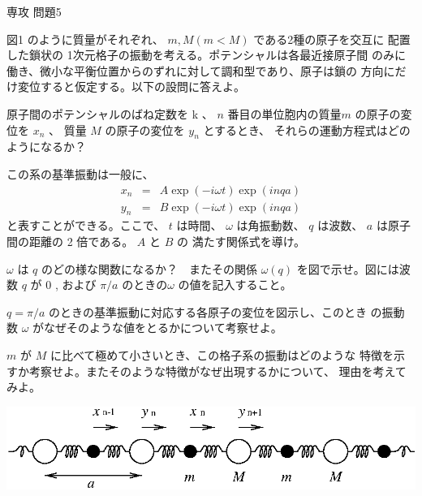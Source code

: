 \documentclass[fleqn]{jbook}
\begin{document}
\begin{question}{専攻 問題5}{}


図1 のように質量がそれぞれ、 $m, M (m < M)$ である2種の原子を交互に
配置した鎖状の 1次元格子の振動を考える。ポテンシャルは各最近接原子間
のみに働き、微小な平衡位置からのずれに対して調和型であり、原子は鎖の
方向にだけ変位すると仮定する。以下の設問に答えよ。

\begin{subquestions}
\SubQuestion
  原子間のポテンシャルのばね定数を k 、 $n$ 番目の単位胞内の質量$m$
  の原子の変位を $x_n$ 、 質量 $M$ の原子の変位を $y_n$ とするとき、
  それらの運動方程式はどのようになるか？


\SubQuestion
  この系の基準振動は一般に、
%
  \begin{eqnarray*}
    x_n &=& A \exp ( - i\omega t) \exp (i n q a) \\
    y_n &=& B \exp ( - i\omega t) \exp (i n q a)
  \end{eqnarray*}
%
  と表すことができる。ここで、 $t$ は時間、 $\omega$ は角振動数、
  $q$ は波数、 $a$ は原子間の距離の 2 倍である。 $A$ と $B$ の
  満たす関係式を導け。


\SubQuestion
  $\omega$ は $q$ のどの様な関数になるか？　またその関係 $\omega (q)$ 
  を図で示せ。図には波数 $q$ が 0 , および $\pi/a$ のときの$\omega$
  の値を記入すること。


\SubQuestion
  $q=\pi/a$ のときの基準振動に対応する各原子の変位を図示し、このとき
  の振動数 $\omega$ がなぜそのような値をとるかについて考察せよ。


\SubQuestion
  $m$ が $M$ に比べて極めて小さいとき、この格子系の振動はどのような
  特徴を示すか考察せよ。またそのような特徴がなぜ出現するかについて、
  理由を考えてみよ。

\end{subquestions}

\begin{center}
  \mbox{\includegraphics[clip]{1994phy5-1.eps}}
\end{center}

\end{question}
\end{document}
